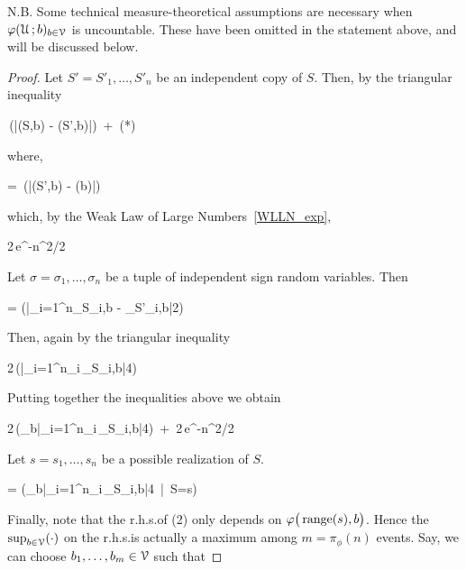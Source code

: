 \documentclass[scombinatorics.tex]{subfiles}
\begin{document}
N.B. Some technical measure-theoretical assumptions are necessary when $\varphi(\EuScript U\,;b)_{b\in\EuScript V}$ is uncountable.
These have been omitted in the statement above, and will be discussed below.

\begin{proof}
  Let $S'=S'_1,\dots,S'_n$ be an independent copy of $S$.
  Then, by the triangular inequality

  {\le}
  {\Pr\,\bigg(\big|\Fr(S,b) - \Fr(S',b)\big|\ge\frac{}\bigg)\ +\ (*)}

  where,

  \ceq{\hfill (*)}
  {=}
  {\Pr\,\bigg(\big|\Fr(S',b) - \Pr(b)\big|\ge\frac{}\bigg)}
 
 which, by the Weak Law of Large Numbers~\ref{WLLN_exp}, 
  
  \ceq{}
  {\le}
  {2\,e^{-n\epsilon^2/2}}

  Let $\sigma=\sigma_1,\dots,\sigma_n$ be a tuple of independent sign random variables.
  Then
  
  {=}
  {\Pr\bigg(\Big|\sum_{i=1}^n\Indicator_{S_i,b} - \Indicator_{S'_i,b}\Big|\ge{}2\bigg)}

  Then, again by the triangular inequality

  \ceq{}
  {\le}
  {2\,\Pr\bigg(\Big|\sum_{i=1}^n\sigma_i\,\Indicator_{S_i,b}\Big|\ge{}4\bigg)}

  Putting together the inequalities above we obtain\smallskip

  {\le}
  {2\,\Pr\bigg(\sup_{b\in\V}\Big|\sum_{i=1}^n\sigma_i\,\Indicator_{S_i,b}\Big|\ge{}4\bigg)\ +\ 2\,e^{-n\epsilon^2/2}}
  \smallskip

  Let $s=s_1,\dots,s_n$ be a possible realization of $S$.\smallskip

  {=}
  {\Pr\bigg(\sup_{b\in\V}\Big|\sum_{i=1}^n\sigma_i\,\Indicator_{S_i,b}\Big|\ge{}4\ \big|\  S=s\bigg)}
  \smallskip

  Finally, note that the r.h.s.\@ of (2) only depends on $\varphi\big(\mathop{\rm range}(s),b\big)$.
  Hence the $\sup_{b\in\EuScript V}(\cdot)$ on the r.h.s.\@ is actually a maximum among $m=\pi_\phi(n)$ events.
  Say, we can choose $b_1,\dots,b_m\in\EuScript V$ such that


\end{proof}
\end{document}
